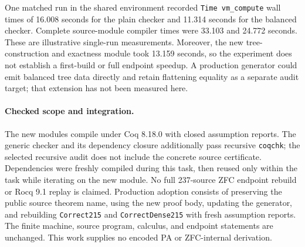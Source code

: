One matched run in the shared environment recorded
\texttt{Time vm\_compute} wall times of 16.008 seconds for the plain checker
and 11.314 seconds for the balanced checker. Complete source-module compiler
times were 33.103 and 24.772 seconds. These are illustrative single-run
measurements. Moreover, the new tree-construction and exactness module took
13.159 seconds, so the experiment does not establish a first-build or full
endpoint speedup. A production generator could emit balanced tree data
directly and retain flattening equality as a separate audit target; that
extension has not been measured here.

\paragraph{Checked scope and integration.}
The new modules compile under Coq 8.18.0 with closed assumption reports.
The generic checker and its dependency closure additionally pass recursive
\texttt{coqchk}; the selected recursive audit does not include the concrete
source certificate. Dependencies were freshly compiled during this task,
then reused only within the task while iterating on the new module.
No full 237-source ZFC endpoint rebuild or Rocq 9.1 replay is claimed.
Production adoption consists of preserving the public source theorem name,
using the new proof body, updating the generator, and rebuilding
\texttt{Correct215} and \texttt{CorrectDense215} with fresh assumption reports.
The finite machine, source program, calculus, and endpoint statements are
unchanged. This work supplies no encoded PA or ZFC-internal derivation.
